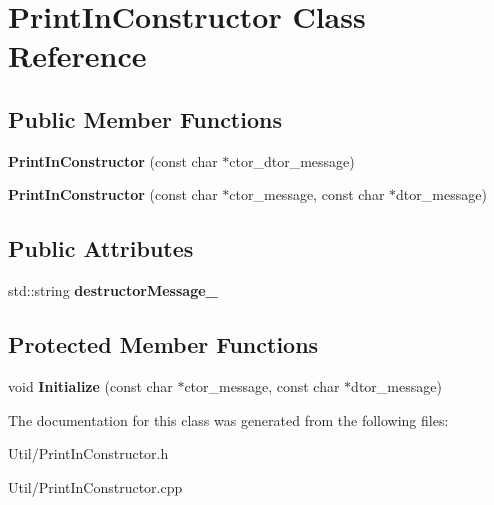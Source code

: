 \hypertarget{class_print_in_constructor}{
\section{\-Print\-In\-Constructor \-Class \-Reference}
\label{class_print_in_constructor}
}
\subsection*{\-Public \-Member \-Functions}
\begin{DoxyCompactItemize}
\item 
\hypertarget{class_print_in_constructor_a325bfa0ad054243598783a66efe62929}{
{\bfseries \-Print\-In\-Constructor} (const char $\ast$ctor\-\_\-dtor\-\_\-message)}
\label{class_print_in_constructor_a325bfa0ad054243598783a66efe62929}

\item 
\hypertarget{class_print_in_constructor_abbb5d38c5df27a4329c32b4855d5314c}{
{\bfseries \-Print\-In\-Constructor} (const char $\ast$ctor\-\_\-message, const char $\ast$dtor\-\_\-message)}
\label{class_print_in_constructor_abbb5d38c5df27a4329c32b4855d5314c}

\end{DoxyCompactItemize}
\subsection*{\-Public \-Attributes}
\begin{DoxyCompactItemize}
\item 
\hypertarget{class_print_in_constructor_a1309cc9a11057725be496b726de64264}{
std\-::string {\bfseries destructor\-Message\-\_\-}}
\label{class_print_in_constructor_a1309cc9a11057725be496b726de64264}

\end{DoxyCompactItemize}
\subsection*{\-Protected \-Member \-Functions}
\begin{DoxyCompactItemize}
\item 
\hypertarget{class_print_in_constructor_a92a3e887114ae3ee7cacbb2196f8279e}{
void {\bfseries \-Initialize} (const char $\ast$ctor\-\_\-message, const char $\ast$dtor\-\_\-message)}
\label{class_print_in_constructor_a92a3e887114ae3ee7cacbb2196f8279e}

\end{DoxyCompactItemize}


\-The documentation for this class was generated from the following files\-:\begin{DoxyCompactItemize}
\item 
\-Util/\-Print\-In\-Constructor.\-h\item 
\-Util/\-Print\-In\-Constructor.\-cpp\end{DoxyCompactItemize}
